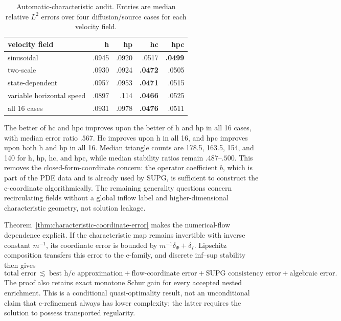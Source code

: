 \documentclass[11pt]{article}
\numberwithin{algorithm}{section}
\theoremstyle{definition}\newtheorem{definition}[theorem]{Definition}
\theoremstyle{remark}\newtheorem{remark}[theorem]{Remark}
\begin{document}
\begin{table}[t]
\centering
\caption{Automatic-characteristic audit. Entries are median relative $L^2$
errors over four diffusion/source cases for each velocity field.}
\label{tab:automatic-characteristics}
\begin{tabular}{lrrrr}
\toprule
velocity field & h & hp & hc & hpc\\
\midrule
sinusoidal & .0945 & .0920 & .0517 & \textbf{.0499}\\
two-scale & .0930 & .0924 & \textbf{.0472} & .0505\\
state-dependent & .0957 & .0953 & \textbf{.0471} & .0515\\
variable horizontal speed & .0897 & .114 & \textbf{.0466} & .0525\\
\midrule
all 16 cases & .0931 & .0978 & \textbf{.0476} & .0511\\
\bottomrule
\end{tabular}
\end{table}

The better of hc and hpc improves upon the better of h and hp in all 16 cases,
with median error ratio $.567$.  Hc improves upon h in all 16, and hpc improves
upon both h and hp in all 16.  Median triangle counts are 178.5, 163.5, 154,
and 140 for h, hp, hc, and hpc, while median stability ratios remain
$.487$--$.500$.  This removes the closed-form-coordinate concern: the operator
coefficient $b$, which is part of the PDE data and is already used by SUPG,
is sufficient to construct the c-coordinate algorithmically.  The remaining
generality questions concern recirculating fields without a global inflow
label and higher-dimensional characteristic geometry, not solution leakage.

Theorem~\ref{thm:characteristic-coordinate-error} makes the numerical-flow
dependence explicit.  If the characteristic map remains invertible with
inverse constant $m^{-1}$, its coordinate error is bounded by
$m^{-1}\delta_\Phi+\delta_I$.  Lipschitz composition transfers this error to
the c-family, and discrete inf--sup stability then gives
\[
 \text{total error}
 \ \lesssim\ \text{best h/c approximation}
 +\text{flow-coordinate error}
 +\text{SUPG consistency error}
 +\text{algebraic error}.
\]
The proof also retains exact monotone Schur gain for every accepted nested
enrichment.  This is a conditional quasi-optimality result, not an unconditional
claim that c-refinement always has lower complexity; the latter requires the
solution to possess transported regularity.
\end{document}
